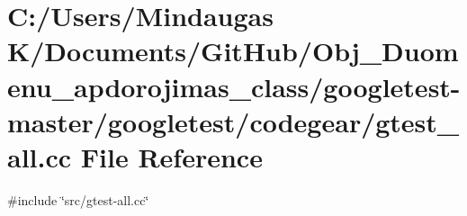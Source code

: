 \hypertarget{googletest-master_2googletest_2codegear_2gtest__all_8cc}{}\section{C\+:/\+Users/\+Mindaugas K/\+Documents/\+Git\+Hub/\+Obj\+\_\+\+Duomenu\+\_\+apdorojimas\+\_\+class/googletest-\/master/googletest/codegear/gtest\+\_\+all.cc File Reference}
\label{googletest-master_2googletest_2codegear_2gtest__all_8cc}
{\ttfamily \#include \char`\"{}src/gtest-\/all.\+cc\char`\"{}}\newline
